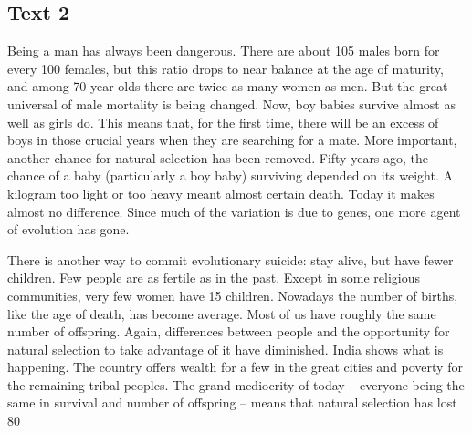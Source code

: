 \subsection{Text 2}
Being a man has always been dangerous. There are about 105 males born for every 100 females, but this ratio drops to near balance at the age of maturity, and among 70-year-olds there are twice as many women as men. But the great universal of male mortality is being changed. Now, boy babies survive almost as well as girls do. This means that, for the first time, there will be an excess of boys in those crucial years when they are searching for a mate. More important, another chance for natural selection has been removed. Fifty years ago, the chance of a baby (particularly a boy baby) surviving depended on its weight. A kilogram too light or too heavy meant almost certain death. Today it makes almost no difference. Since much of the variation is due to genes, one more agent of evolution has gone.

There is another way to commit evolutionary suicide: stay alive, but have fewer children. Few people are as fertile as in the past. Except in some religious communities, very few women have 15 children. Nowadays the number of births, like the age of death, has become average. Most of us have roughly the same number of offspring. Again, differences between people and the opportunity for natural selection to take advantage of it have diminished. India shows what is happening. The country offers wealth for a few in the great cities and poverty for the remaining tribal peoples. The grand mediocrity of today -- everyone being the same in survival and number of offspring -- means that natural selection has lost 80%

